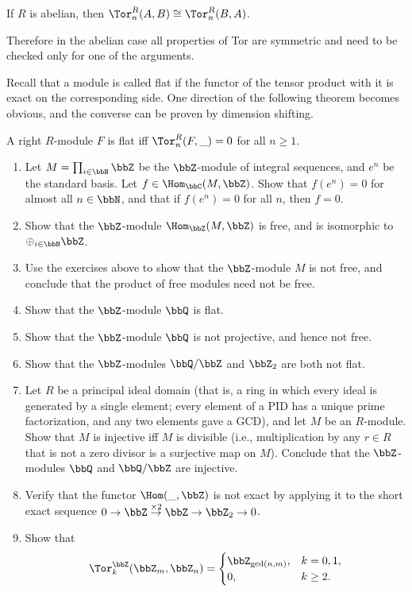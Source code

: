 \begin{cor}
    If $R$ is abelian, then $\Tor_n^R(A,B)\cong \Tor_n^R(B,A)$.
\end{cor}

Therefore in the abelian case all properties of Tor are symmetric and need to be checked only for one of the arguments.

Recall that a module is called flat if the functor of the tensor product with it is exact on the corresponding side.  One direction of the following theorem becomes obvious, and the converse can be proven by dimension shifting.

\begin{thm}
    A right $R$-module $F$ is flat iff $\Tor_n^R(F,\_)=0$ for all $n\geq 1$.
\end{thm}

\begin{xca}
    \begin{enumerate}
        \item Let $M=\prod_{i\in\bbN}\bbZ$ be the $\bbZ$-module of integral sequences, and $e^n$ be the standard basis. Let $f\in \Hom_\bbC(M,\bbZ)$. Show that $f(e^n)=0$ for almost all $n\in \bbN$, and that if $f(e^n)=0$ for all $n$, then $f=0$.
        \item Show that the $\bbZ$-module $\Hom_\bbZ(M,\bbZ)$ is free, and is isomorphic to $\oplus_{i\in \bbN}\bbZ$.
        \item Use the exercises above to show that the $\bbZ$-module $M$ is not free, and conclude that the product of free modules need not be free.
        \item Show that the $\bbZ$-module $\bbQ$ is flat.
        \item Show that the $\bbZ$-module $\bbQ$ is not projective, and hence not free.
        \item Show that the $\bbZ$-modules $\bbQ\slash\bbZ$ and $\bbZ_2$ are both not flat.
        \item Let $R$ be a principal ideal domain (that is, a ring in which every ideal is generated by a single element; every element of a PID has a unique prime factorization, and any two elements gave a GCD), and let $M$ be an $R$-module. Show that $M$ is injective iff $M$ is divisible (i.e., multiplication by any $r\in R$ that is not a zero divisor is a surjective map on $M$). Conclude that the $\bbZ$-modules $\bbQ$ and $\bbQ\slash\bbZ$ are injective.
        \item Verify that the functor $\Hom(\_,\bbZ)$ is not exact by applying it to the short exact sequence $0\to \bbZ\overset{\times 2}{\to}\bbZ\to \bbZ_2\to 0$.
        \item Show that 
            \[\Tor_k^\bbZ(\bbZ_m,\bbZ_n)=
                \begin{cases}
                \bbZ_{\gcd(n,m)},&k=0,1,\\
                0,& k\geq 2.
                \end{cases}
            \]
    \end{enumerate}
\end{xca}


